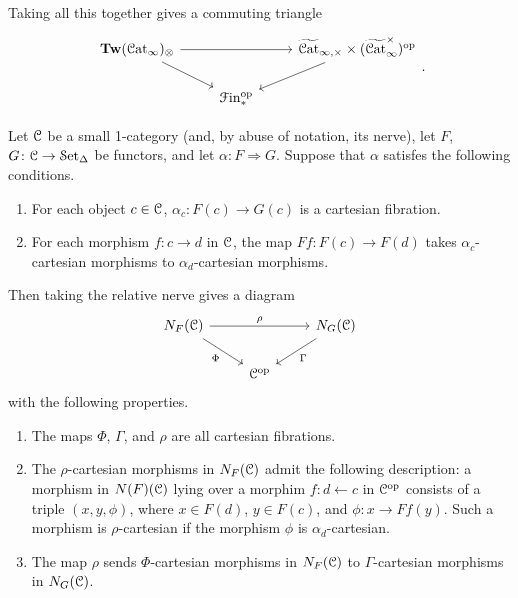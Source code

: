 \documentclass[main.tex]{subfiles}
\begin{document}
Taking all this together gives a commuting triangle
\begin{equation*}
  \begin{tikzcd}
    \Tw(\ICat)_{\otimes}
    \arrow[rr]
    \arrow[dr]
    && \TICatCart \times (\TICatCocart)\op
    \arrow[dl]
    \\
    & \Finp\op
  \end{tikzcd}.
\end{equation*}

\begin{lemma}
  Let $\mathcal{C}$ be a small 1-category (and, by abuse of notation, its nerve), let $F$, $G\colon \mathcal{C} \to \mathcal{S}\mathrm{et}_{\Delta}$ be functors, and let $\alpha\colon F \Rightarrow G$. Suppose that $\alpha$ satisfes the following conditions.
  \begin{enumerate}
    \item For each object $c \in \mathcal{C}$, $\alpha_{c}\colon F(c) \to G(c)$ is a cartesian fibration.

    \item For each morphism $f\colon c \to d$ in $\mathcal{C}$, the map $Ff\colon F(c) \to F(d)$ takes $\alpha_{c}$-cartesian morphisms to $\alpha_{d}$-cartesian morphisms.
  \end{enumerate}
  Then taking the relative nerve gives a diagram
  \begin{equation*}
    \begin{tikzcd}
      N_{F}(\category{C})
      \arrow[rr, "\rho"]
      \arrow[dr, swap, "\Phi"]
      &&
      N_{G}(\category{C})
      \arrow[dl, "\Gamma"]
      \\
      & \category{C}\op
    \end{tikzcd}
  \end{equation*}
  with the following properties.
  \begin{enumerate}
    \item The maps $\Phi$, $\Gamma$, and $\rho$ are all cartesian fibrations.

    \item The $\rho$-cartesian morphisms in $N_{F}(\mathcal{C})$ admit the following description: a morphism in $N(F)(\mathcal{C})$ lying over a morphim $f\colon d \leftarrow c$ in $\mathcal{C}^{\mathrm{op}}$ consists of a triple $(x, y, \phi)$, where $x \in F(d)$, $y \in F(c)$, and $\phi\colon x \to Ff(y)$. Such a morphism is $\rho$-cartesian if the morphism $\phi$ is $\alpha_{d}$-cartesian.

    \item The map $\rho$ sends $\Phi$-cartesian morphisms in $N_{F}(\mathcal{C})$ to $\Gamma$-cartesian morphisms in $N_{G}(\mathcal{C})$.
  \end{enumerate}
\end{lemma}
\end{document}
